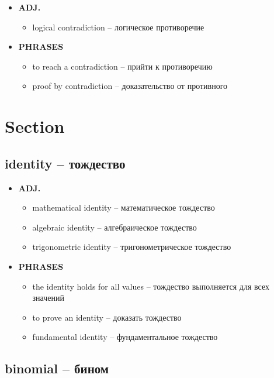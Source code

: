 \documentclass[a4paper, 10pt]{article}
\theoremstyle{definition}
\theoremstyle{plain}
\theoremstyle{remark}
\begin{document}
\begin{itemize}
    \item \textbf{ADJ.}
    \begin{itemize}
        \item logical contradiction – логическое противоречие
    \end{itemize}
    
    \item \textbf{PHRASES}
    \begin{itemize}
        \item to reach a contradiction – прийти к противоречию
        \item proof by contradiction – доказательство от противного
    \end{itemize}
\end{itemize}

\section{Section}

\subsection{identity – тождество}

\begin{itemize}
    \item \textbf{ADJ.}
    \begin{itemize}
        \item mathematical identity – математическое тождество
        \item algebraic identity – алгебраическое тождество
        \item trigonometric identity – тригонометрическое тождество
    \end{itemize}
    
    \item \textbf{PHRASES}
    \begin{itemize}
        \item the identity holds for all values – тождество выполняется для всех значений
        \item to prove an identity – доказать тождество
        \item fundamental identity – фундаментальное тождество
    \end{itemize}
\end{itemize}

\subsection{binomial – бином}
\end{document}
